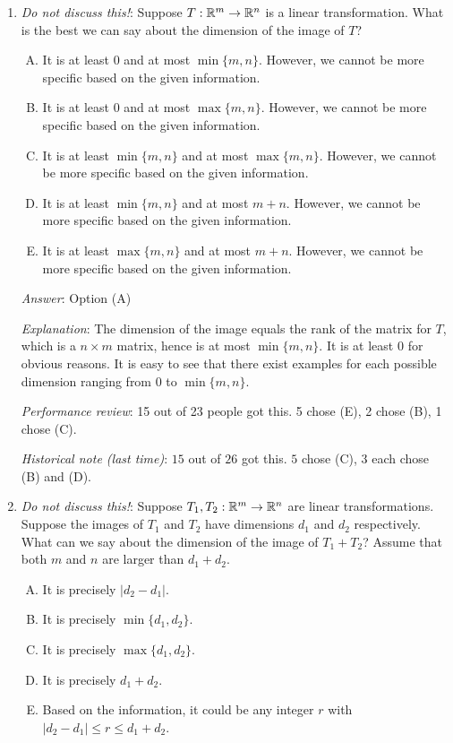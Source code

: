 \documentclass[10pt]{amsart}
\begin{document}
\begin{enumerate}
\item {\em Do not discuss this!}: Suppose $T:\mathbb{R}^m \to \mathbb{R}^n$ is a
  linear transformation. What is the best we can say about the
  dimension of the image of $T$?

  \begin{enumerate}[(A)]
  \item It is at least $0$ and at most $\min \{m,n\}$. However, we
    cannot be more specific based on the given information.
  \item It is at least $0$ and at most $\max \{m,n \}$. However, we
    cannot be more specific based on the given information.
  \item It is at least $\min \{ m,n \}$ and at most $\max \{ m,n
    \}$. However, we cannot be more specific based on the given information.
  \item It is at least $\min \{ m,n \}$ and at most $m + n$. However,
    we cannot be more specific based on the given information.
  \item It is at least $\max \{ m,n \}$ and at most $m + n$. However,
    we cannot be more specific based on the given information.
  \end{enumerate}

  {\em Answer}: Option (A)

  {\em Explanation}: The dimension of the image equals the rank of the
  matrix for $T$, which is a $n \times m$ matrix, hence is at most
  $\min \{ m, n\}$. It is at least $0$ for obvious reasons. It is easy
  to see that there exist examples for each possible dimension ranging
  from $0$ to $\min \{ m,n \}$.

  {\em Performance review}: 15 out of 23 people got this. 5 chose (E),
  2 chose (B), 1 chose (C).

  {\em Historical note (last time)}: $15$ out of $26$ got this. $5$ chose (C),
  $3$ each chose (B) and (D).

\item {\em Do not discuss this!}: Suppose $T_1,T_2:\mathbb{R}^m \to \mathbb{R}^n$ are
  linear transformations. Suppose the images of $T_1$ and $T_2$ have
  dimensions $d_1$ and $d_2$ respectively. What can we say about the
  dimension of the image of $T_1 + T_2$? Assume that both $m$ and $n$
  are larger than $d_1 + d_2$.

  \begin{enumerate}[(A)]
  \item It is precisely $|d_2 - d_1|$.
  \item It is precisely $\min \{ d_1, d_2 \}$.
  \item It is precisely $\max \{ d_1, d_2 \}$.
  \item It is precisely $d_1 + d_2$.
  \item Based on the information, it could be any integer $r$ with
    $|d_2 - d_1| \le r \le d_1 + d_2$.
  \end{enumerate}


\end{enumerate}
\end{document}
